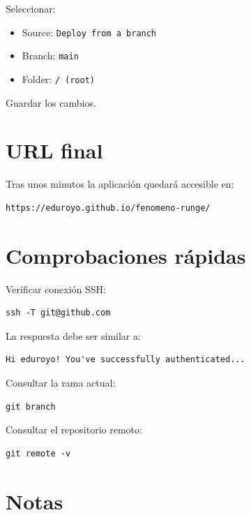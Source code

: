 \documentclass[11pt,a4paper]{article}
\begin{document}
Seleccionar:

\begin{itemize}
	\item Source: \texttt{Deploy from a branch}
	\item Branch: \texttt{main}
	\item Folder: \texttt{/ (root)}
\end{itemize}

Guardar los cambios.

\section{URL final}

Tras unos minutos la aplicación quedará accesible en:

\begin{lstlisting}
https://eduroyo.github.io/fenomeno-runge/
\end{lstlisting}

\section{Comprobaciones rápidas}

Verificar conexión SSH:

\begin{lstlisting}
ssh -T git@github.com
\end{lstlisting}

La respuesta debe ser similar a:

\begin{lstlisting}
Hi eduroyo! You've successfully authenticated...
\end{lstlisting}

Consultar la rama actual:

\begin{lstlisting}
git branch
\end{lstlisting}

Consultar el repositorio remoto:

\begin{lstlisting}
git remote -v
\end{lstlisting}

\section{Notas}
\end{document}
